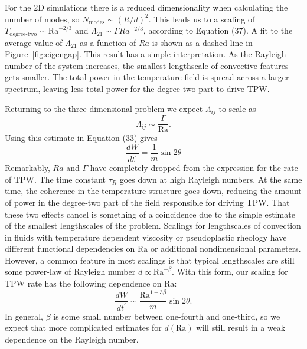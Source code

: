 \documentclass[preprint,12pt,authoryear]{elsarticle}
\begin{document}
For the 2D simulations there is a reduced dimensionality when calculating the number of modes,
so $N_\text{modes} \sim \left(R/d \right)^2$.  This leads us to a scaling of $T_{\text{degree-two}} \sim \mathrm{Ra}^{-2/3}$ and $\Lambda_{21} \sim \Gamma Ra^{-2/3}$, according to Equation (37).  A fit to the average value of $\Lambda_{21}$ as a function of $Ra$ is shown as a dashed line in Figure~\ref{fig:eigengap}.
This result has a simple interpretation.
As the Rayleigh number of the system increases, the smallest lengthscale of convective features gets smaller.
The total power in the temperature field is spread across a larger spectrum, leaving less total power for the degree-two part to drive TPW.


Returning to the three-dimensional problem we expect $\Lambda_{ij}$ to scale as
\begin{equation}
\Lambda_{ij} \sim \frac{\Gamma}{\mathrm{Ra} }.
\label{eq:lambda_estimate}
\end{equation}
Using this estimate in Equation (33) gives
\begin{equation}
\frac{d W}{dt^\prime} = \frac{1}{m} \sin 2 \theta
\end{equation}
Remarkably, $Ra$ and $\Gamma$ have completely dropped from the expression for the rate of TPW.  The time constant $\tau_R$ goes down at high Rayleigh numbers. At the same time, the  coherence in the temperature structure goes down, reducing the amount of power in the degree-two part of the field responsible for driving TPW.
That these two effects cancel is something of a coincidence due to the simple estimate of the smallest lengthscales of the problem.
Scalings for lengthscales of convection in fluids with temperature dependent viscosity \citep[e.g.][]{solomatov1995scaling} or pseudoplastic rheology \citep[e.g.][]{korenaga2010scaling} have different functional dependencies on $\mathrm{Ra}$ or additional nondimensional parameters.
However, a common feature in most scalings is that typical lengthscales are still some power-law of Rayleigh number $d \propto \mathrm{Ra}^{-\beta}$.
With this form, our scaling for TPW rate has the following dependence on $\mathrm{Ra}$:
\begin{equation}
\frac{d W}{dt^\prime} \sim \frac{\mathrm{Ra}^{1-3\beta}}{m} \sin{2 \theta}.
\label{eq:simplest_milankovitch_defer_scaling}
\end{equation}
In general, $\beta$ is some small number between one-fourth and one-third, so we expect that more complicated estimates for 
$d(\mathrm{Ra})$ will still result in a weak dependence 
on the Rayleigh number.
\end{document}
